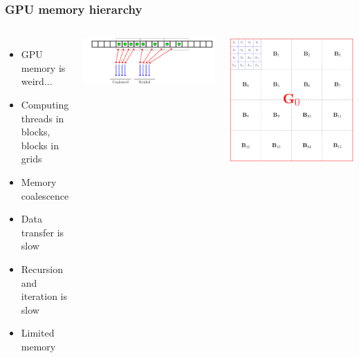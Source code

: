 \documentclass{beamer}
\begin{document}
\begin{frame}
\frametitle{GPU memory hierarchy}

\begin{columns}
\begin{itemize}
\item GPU memory is weird...
\item Computing threads in blocks, blocks in grids
\item Memory coalescence
\item Data transfer is slow
\item Recursion and iteration is slow
\item Limited memory
\end{itemize}

\vspace{0.5cm}
\includegraphics[width=\textwidth]{../data/gpu/coalesce/check.pdf}


\includegraphics[width=\textwidth]{../data/gpu/gputhreads.pdf}
\end{columns}
\end{frame}
\end{document}
